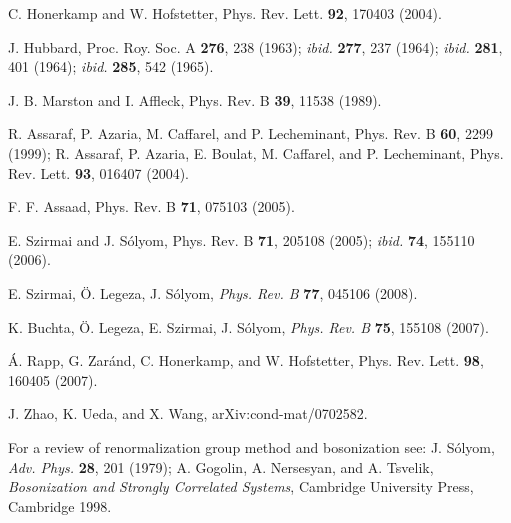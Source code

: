 \documentclass[aps,prb,twocolumn,floatfix,showpacs]{revtex4}
\begin{document}
\begin{thebibliography}{}

 C. Honerkamp and W. Hofstetter, Phys. Rev. Lett. {\bf 92},
170403 (2004).

 J. Hubbard, Proc. Roy. Soc. A {\bf 276}, 238 (1963); {\it
    ibid.} {\bf 277}, 237 (1964); {\it ibid.} {\bf 281}, 401 (1964); {\it
    ibid.}  {\bf 285}, 542 (1965).

 J. B. Marston and I. Affleck, Phys. Rev. B {\bf 39}, 11538
(1989).

 R. Assaraf, P. Azaria, M. Caffarel, and P. Lecheminant,
  Phys. Rev. B {\bf 60}, 2299 (1999);
R. Assaraf, P. Azaria, E. Boulat, M. Caffarel, and
  P. Lecheminant, Phys. Rev. Lett. {\bf 93}, 016407 (2004).

 F. F. Assaad, Phys. Rev. B {\bf 71}, 075103 (2005).

 E. Szirmai and J. S\'olyom, Phys. Rev. B {\bf 71}, 205108
(2005);  {\em ibid.}  {\bf 74}, 155110 (2006).

 E. Szirmai, \"O. Legeza, J. S\'olyom, {\em
  Phys. Rev. B} {\bf 77}, 045106 (2008).


 K. Buchta, \"O. Legeza, E. Szirmai, J. S\'olyom, {\em
  Phys. Rev. B} {\bf 75}, 155108 (2007).



 \'A. Rapp, G. Zar\'and, C. Honerkamp, and W. Hofstetter,
Phys. Rev. Lett. {\bf 98}, 160405 (2007).

 J. Zhao, K. Ueda, and X. Wang, arXiv:cond-mat/0702582.




 For a review of renormalization group method and bosonization
  see: J. S\'olyom, {\em Adv. Phys.} {\bf 28}, 201 (1979);
A. Gogolin, A. Nersesyan, and A. Tsvelik, {\em Bosonization and
  Strongly Correlated Systems}, Cambridge University Press, Cambridge 1998. 


\end{thebibliography}
\end{document}
